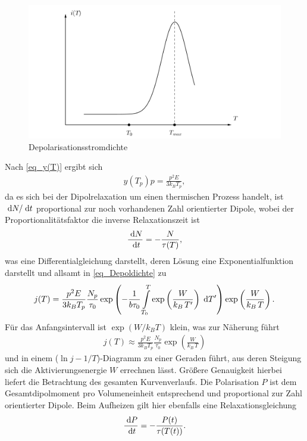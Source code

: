 \begin{figure}[H]
\includegraphics[width=\textwidth]{../pics/i(T).png}
\caption{Depolarisationsstromdichte}
\label{pic_i(T)}
\end{figure}
Nach \eqref{eq_y(T)} ergibt sich 
\begin{align}
 y(T_p)p=\frac{p^2E}{3k_BT_p},
\end{align}
da es sich bei der Dipolrelaxation um einen thermischen Prozess handelt, ist $\; \mathrm{d} N/\; \mathrm{d} t$ proportional zur noch vorhandenen Zahl orientierter Dipole,
wobei der Proportionalitätsfaktor die inverse Relaxationszeit ist
\begin{align}
 \frac{\; \mathrm{d} N}{\; \mathrm{d} t} = -\frac{N}{\tau(T)},
\end{align}
was eine Differentialgleichung darstellt, deren Lösung eine Exponentialfunktion darstellt und allsamt in \eqref{eq_Depoldichte} zu
\begin{align}
 j(T)=\frac{p^2E}{3k_BT_p}\frac{N_p}{\tau_0}\exp\left(-\frac{1}{b\tau_0}\int\limits_{T_0}^T \exp\left(\frac{W}{k_B\, T'}\right) \; \mathrm{d} T'  \right) \exp\left(\frac{W}{k_B\, T}\right).
 \label{eq_jlang}
 \end{align}
Für das Anfangsintervall ist $\exp(W/k_BT)$ klein, was zur Näherung führt
\begin{align}
 j(T) \approx \frac{p^2E}{3k_BT_p}\frac{N_p}{\tau_0}\exp\left(\frac{W}{k_B\, T}\right)
 \label{eq_j(T)}
\end{align}
und in einem ($\ln j-1/T$)-Diagramm zu einer Geraden führt, aus deren Steigung sich die Aktivierungsenergie $W$ errechnen lässt. Größere Genauigkeit
hierbei liefert die Betrachtung des gesamten Kurvenverlaufs. Die Polarisation $P$ ist dem Gesamtdipolmoment pro Volumeneinheit entsprechend und
proportional zur Zahl orientierter Dipole. Beim Aufheizen gilt hier ebenfalls eine Relaxationsgleichung
\begin{align}
 \frac{\; \mathrm{d} P}{\; \mathrm{d} t} = - \frac{P(t)}{\tau(T(t))}.
\end{align}

